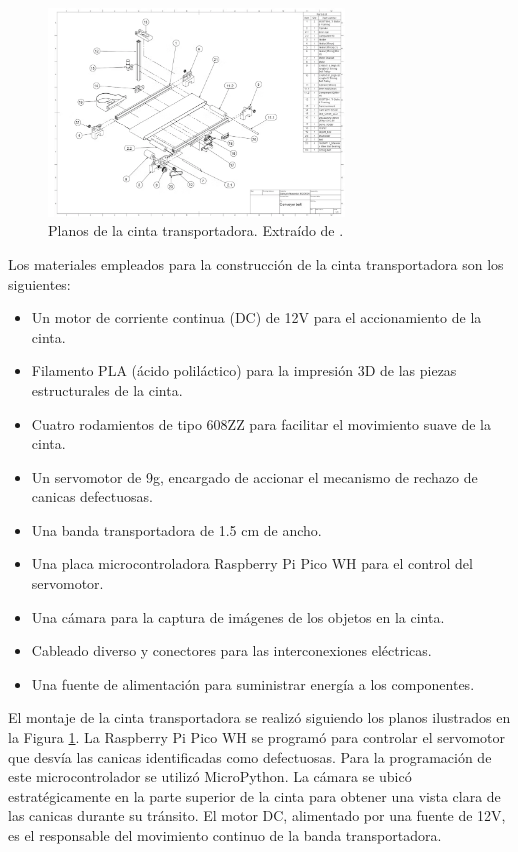 \documentclass[11pt,spanish,listoffigures,listoftables]{tfgetsinf}
\begin{document}
\begin{figure}[H]
   \centering
   \includegraphics[width=0.7\textwidth]{images/prueba_de_concepto/planos_cinta.png}
   \caption[Planos de la cinta transportadora]{Planos de la cinta transportadora. Extraído de \cite{hackster_counting_inspection}.}
   \label{fig:planos_cinta}
\end{figure}

Los materiales empleados para la construcción de la cinta transportadora son los siguientes:

\begin{itemize}
   \item Un motor de corriente continua (DC) de 12V para el accionamiento de la cinta.
   \item Filamento PLA (ácido poliláctico) para la impresión 3D de las piezas estructurales de la cinta.
   \item Cuatro rodamientos de tipo 608ZZ para facilitar el movimiento suave de la cinta.
   \item Un servomotor de 9g, encargado de accionar el mecanismo de rechazo de canicas defectuosas.
   \item Una banda transportadora de 1.5 cm de ancho.
   \item Una placa microcontroladora Raspberry Pi Pico WH para el control del servomotor.
   \item Una cámara para la captura de imágenes de los objetos en la cinta.
   \item Cableado diverso y conectores para las interconexiones eléctricas.
   \item Una fuente de alimentación para suministrar energía a los componentes.
\end{itemize}

El montaje de la cinta transportadora se realizó siguiendo los planos ilustrados en la Figura \ref{fig:planos_cinta}. La Raspberry Pi Pico WH se programó para controlar el servomotor que desvía las canicas identificadas como defectuosas. Para la programación de este microcontrolador se utilizó MicroPython\cite{micropython_home}. La cámara se ubicó estratégicamente en la parte superior de la cinta para obtener una vista clara de las canicas durante su tránsito. El motor DC, alimentado por una fuente de 12V, es el responsable del movimiento continuo de la banda transportadora.
\end{document}
